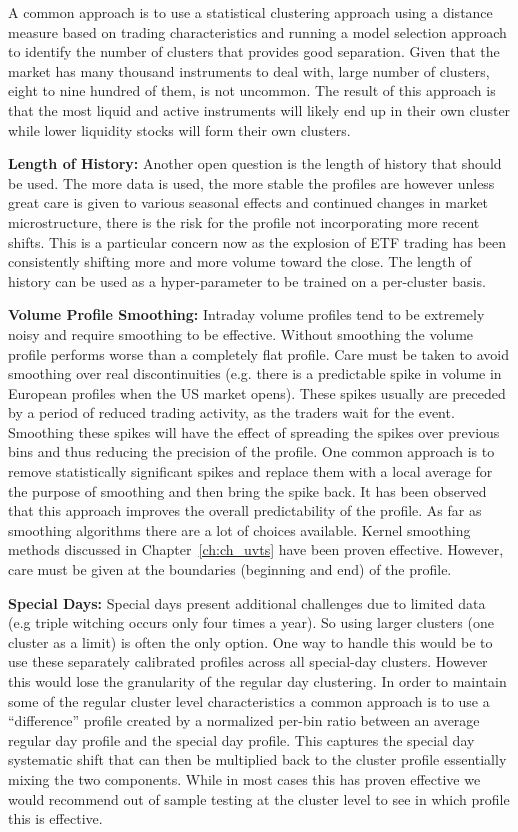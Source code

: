 A common approach is to use a statistical clustering approach using a distance measure based on trading characteristics and running a model selection approach to identify the number of clusters that provides good separation. Given that the market has many thousand instruments to deal with, large number of clusters, eight to nine hundred of them, is not uncommon. The result of this approach is that the most liquid and active instruments will likely end up in their own cluster while lower liquidity stocks will form their own clusters. \twomedskip


\noindent\textbf{Length of History:} Another open question is the length of history that should be used. The more data is used, the more stable the profiles are however unless great care is given to various seasonal effects and continued changes in market microstructure, there is the risk for the profile not incorporating more recent shifts. This is a particular concern now as the explosion of ETF trading has been consistently shifting more and more volume toward the close. The length of history can be used as a hyper-parameter to be trained on a per-cluster basis. \twomedskip


\noindent\textbf{Volume Profile Smoothing:} Intraday volume profiles tend to be extremely noisy and require smoothing to be effective. Without smoothing the volume profile performs worse than a completely flat profile. Care must be taken to avoid smoothing over real discontinuities (e.g. there is a predictable spike in volume in European profiles when the US market opens). These spikes usually are preceded by a period of reduced trading activity, as the traders wait for the event. Smoothing these spikes will have the effect of spreading the spikes over previous bins and thus reducing the precision of the profile. One common approach is to remove statistically significant spikes and replace them with a local average for the purpose of smoothing and then bring the spike back. It has been observed that this approach improves the overall predictability of the profile. As far as smoothing algorithms there are a lot of choices available. Kernel smoothing methods discussed in Chapter~\ref{ch:ch_uvts} have been proven effective. However, care must be given at the boundaries (beginning and end) of the profile. \twomedskip


\noindent\textbf{Special Days:} Special days present additional challenges due to limited data (e.g triple witching occurs only four times a year). So using larger clusters (one cluster as a limit) is often the only option. One way to handle this would be to use these separately calibrated profiles across all special-day clusters. However this would lose the granularity of the regular day clustering. In order to maintain some of the  regular cluster level characteristics a common approach is to use a ``difference'' profile created by a normalized per-bin ratio between an average regular day profile and the special day profile. This captures the special day systematic shift that can then be multiplied back to the cluster profile essentially mixing the two components. While in most cases this has proven effective we would recommend out of sample testing at the cluster level to see in which profile this is effective. \twomedskip

